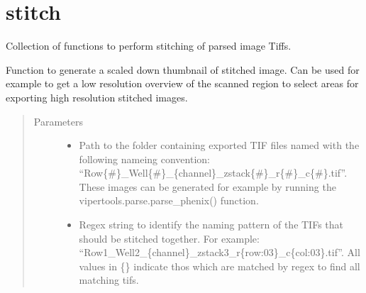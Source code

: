 \documentclass[a4paper,10pt,english,openany,oneside]{sphinxmanual}
\begin{document}
\section{stitch}
\label{\detokenize{pages/modules:stitch}}
\sphinxAtStartPar
Collection of functions to perform stitching of parsed image Tiffs.

\begin{fulllineitems}
\label{\detokenize{pages/modules:vipertools.stitch.generate_stitched}}
\sphinxAtStartPar
Function to generate a scaled down thumbnail of stitched image. Can be used for example to
get a low resolution overview of the scanned region to select areas for exporting high resolution
stitched images.
\begin{quote}\begin{description}
\item[{Parameters}] \leavevmode\begin{itemize}
\item {} 
\sphinxAtStartPar
{} \textendash{} Path to the folder containing exported TIF files named with the following nameing convention: “Row\{\#\}\_Well\{\#\}\_\{channel\}\_zstack\{\#\}\_r\{\#\}\_c\{\#\}.tif”.
These images can be generated for example by running the vipertools.parse.parse\_phenix() function.

\item {} 
\sphinxAtStartPar
{} \textendash{} Regex string to identify the naming pattern of the TIFs that should be stitched together.
For example: “Row1\_Well2\_\{channel\}\_zstack3\_r\{row:03\}\_c\{col:03\}.tif”.
All values in \{\} indicate thos which are matched by regex to find all matching tifs.


\end{itemize}
\end{description}
\end{quote}
\end{fulllineitems}
\end{document}

